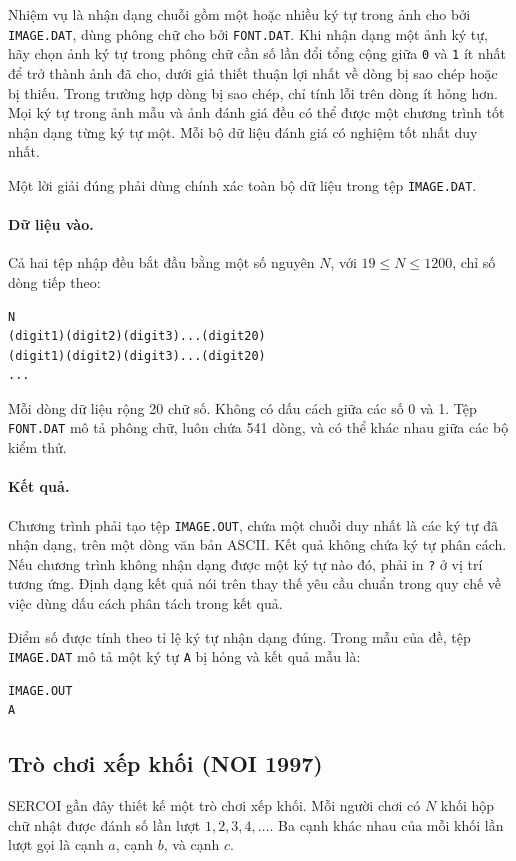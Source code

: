 \documentclass[11pt]{article}
\begin{document}
Nhiệm vụ là nhận dạng chuỗi gồm một hoặc nhiều ký tự trong ảnh cho bởi
\texttt{IMAGE.DAT}, dùng phông chữ cho bởi \texttt{FONT.DAT}. Khi nhận dạng
một ảnh ký tự, hãy chọn ảnh ký tự trong phông chữ cần số lần đổi tổng cộng
giữa \texttt{0} và \texttt{1} ít nhất để trở thành ảnh đã cho, dưới giả thiết
thuận lợi nhất về dòng bị sao chép hoặc bị thiếu. Trong trường hợp dòng bị
sao chép, chỉ tính lỗi trên dòng ít hỏng hơn. Mọi ký tự trong ảnh mẫu và ảnh
đánh giá đều có thể được một chương trình tốt nhận dạng từng ký tự một. Mỗi
bộ dữ liệu đánh giá có nghiệm tốt nhất duy nhất.

Một lời giải đúng phải dùng chính xác toàn bộ dữ liệu trong tệp
\texttt{IMAGE.DAT}.

\paragraph{Dữ liệu vào.}
Cả hai tệp nhập đều bắt đầu bằng một số nguyên \(N\), với
\(19\le N\le 1200\), chỉ số dòng tiếp theo:
\begin{verbatim}
N
(digit1)(digit2)(digit3)...(digit20)
(digit1)(digit2)(digit3)...(digit20)
...
\end{verbatim}
Mỗi dòng dữ liệu rộng 20 chữ số. Không có dấu cách giữa các số 0 và 1. Tệp
\texttt{FONT.DAT} mô tả phông chữ, luôn chứa 541 dòng, và có thể khác nhau
giữa các bộ kiểm thử.

\paragraph{Kết quả.}
Chương trình phải tạo tệp \texttt{IMAGE.OUT}, chứa một chuỗi duy nhất là các
ký tự đã nhận dạng, trên một dòng văn bản ASCII. Kết quả không chứa ký tự phân
cách. Nếu chương trình không nhận dạng được một ký tự nào đó, phải in
\texttt{?} ở vị trí tương ứng. Định dạng kết quả nói trên thay thế yêu cầu
chuẩn trong quy chế về việc dùng dấu cách phân tách trong kết quả.

Điểm số được tính theo tỉ lệ ký tự nhận dạng đúng. Trong mẫu của đề, tệp
\texttt{IMAGE.DAT} mô tả một ký tự \texttt{A} bị hỏng và kết quả mẫu là:
\begin{verbatim}
IMAGE.OUT
A
\end{verbatim}

\subsection{Trò chơi xếp khối (NOI 1997)}

SERCOI gần đây thiết kế một trò chơi xếp khối. Mỗi người chơi có \(N\) khối
hộp chữ nhật được đánh số lần lượt \(1,2,3,4,\ldots\). Ba cạnh khác nhau của
mỗi khối lần lượt gọi là cạnh \(a\), cạnh \(b\), và cạnh \(c\).
\end{document}
